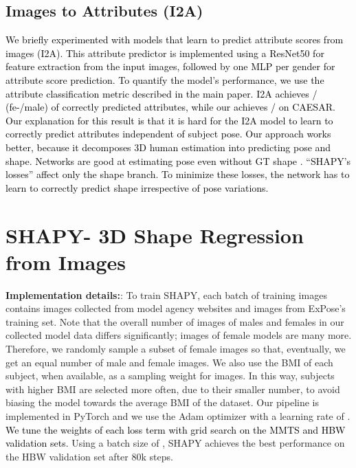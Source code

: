 \documentclass[10pt,twocolumn,letterpaper]{article}
\newcommand{\qheading}[1]{\noindent\textbf{#1}:}
\newcommand{\modelCOLOR}{black}
\newcommand{\modelname}{{\color{\modelCOLOR}SHAPY}\xspace}
\newcommand{\ItoA}{\mbox{I2A}\xspace}
\newcommand{\StoA}{\text{\mbox{S2A}}\xspace}
\newcommand{\expose}{\mbox{ExPose}\xspace}
\newcommand{\threeD}{3D\xspace}
\newcommand{\mmts}{MMTS\xspace}
\newcommand{\hbw}{\mbox{HBW}\xspace}
\newcommand{\caesar}{\mbox{CAESAR}\xspace}
\newcommand{\resnet}{\mbox{ResNet50}\xspace}
\newcommand{\cameraready}[1]{\textcolor{Fuchsia}{{#1}}\xspace}
\renewcommand{\cameraready}[1]{\textcolor{black}{{#1}}\xspace}
\begin{document}
\begin{appendices}
  \subsection{Images to Attributes (\ItoA)}
\label{supmat:subsec:attrs_from_images}

\cameraready{We briefly experimented with models that learn to predict
    attribute scores from images (\ItoA). This attribute predictor
    is implemented using a \resnet for feature extraction from the input
    images, followed by one MLP per gender for attribute score prediction.
    To quantify the model's performance, we use the attribute classification
    metric described in the main paper. \ItoA
    achieves  /  (fe-/male) of correctly predicted attributes,
    while our \StoA achieves  /   on \caesar.
    Our explanation for this result is that it is hard for the \ItoA
    model to learn to correctly
    predict attributes independent of subject pose.
    Our approach works better, because it decomposes \threeD human estimation into predicting pose and
    shape.
    Networks are good at estimating pose even without
    GT shape \cite{li2021hybrik}.
    ``\modelname’s losses''
    affect only the shape branch. To minimize these losses,
    the network has to learn to correctly predict shape irrespective
    of pose variations.
} 
\section{\modelname - \threeD Shape Regression from Images}
\qheading{Implementation details:}
To train \modelname,
each batch of training images contains 
 images collected from model agency websites and 
 images from \expose{'s} \cite{Choutas2020_expose} training set.
Note that the overall number of images of males and females in our collected model data differs significantly; images of female models are many more.
Therefore, we randomly sample a subset of female images so that, eventually, we get an equal number of male and female images.
We also use the BMI of each subject, when available, as a sampling weight for images. 
In this way, subjects with higher BMI are selected more often, due to their smaller number,
to avoid biasing the model towards the average BMI of the dataset.
Our pipeline is implemented in PyTorch \cite{pytorch} and we use the Adam \cite{adam} optimizer with a learning rate of .
\cameraready{We tune the weights of each loss term with
grid search on the \mmts and \hbw validation sets.}
Using a batch size of , \modelname achieves the best performance on the \hbw validation set after 80k steps. 
 

\end{appendices}
\end{document}
